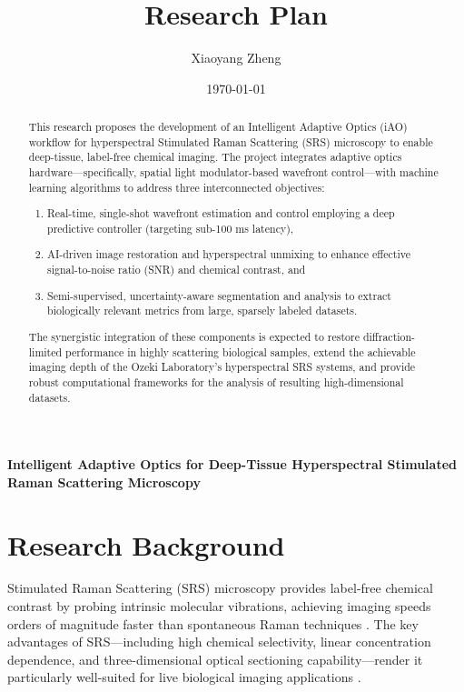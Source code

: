 \documentclass[12pt,a4paper]{article}
\title{Research Plan}
\author{Xiaoyang Zheng}
\date{\today}
\begin{document}
\maketitle
\begin{center}
    \large \textbf{Intelligent Adaptive Optics for Deep-Tissue Hyperspectral Stimulated Raman Scattering Microscopy}
\end{center}
\sloppy

\begin{abstract}
This research proposes the development of an Intelligent Adaptive Optics (iAO) workflow for hyperspectral Stimulated Raman Scattering (SRS) microscopy to enable deep-tissue, label-free chemical imaging. The project integrates adaptive optics hardware—specifically, spatial light modulator-based wavefront control—with machine learning algorithms to address three interconnected objectives:
\begin{enumerate}
  \item Real-time, single-shot wavefront estimation and control employing a deep predictive controller (targeting sub-100 ms latency),
  \item AI-driven image restoration and hyperspectral unmixing to enhance effective signal-to-noise ratio (SNR) and chemical contrast, and
  \item Semi-supervised, uncertainty-aware segmentation and analysis to extract biologically relevant metrics from large, sparsely labeled datasets.
\end{enumerate}
The synergistic integration of these components is expected to restore diffraction-limited performance in highly scattering biological samples, extend the achievable imaging depth of the Ozeki Laboratory's hyperspectral SRS systems, and provide robust computational frameworks for the analysis of resulting high-dimensional datasets.
\end{abstract}

\section{Research Background}
Stimulated Raman Scattering (SRS) microscopy provides label-free chemical contrast by probing intrinsic molecular vibrations, achieving imaging speeds orders of magnitude faster than spontaneous Raman techniques \cite{cheng2015,v_w_freudiger2008}. The key advantages of SRS—including high chemical selectivity, linear concentration dependence, and three-dimensional optical sectioning capability—render it particularly well-suited for live biological imaging applications \cite{tipping2024}.
\end{document}
